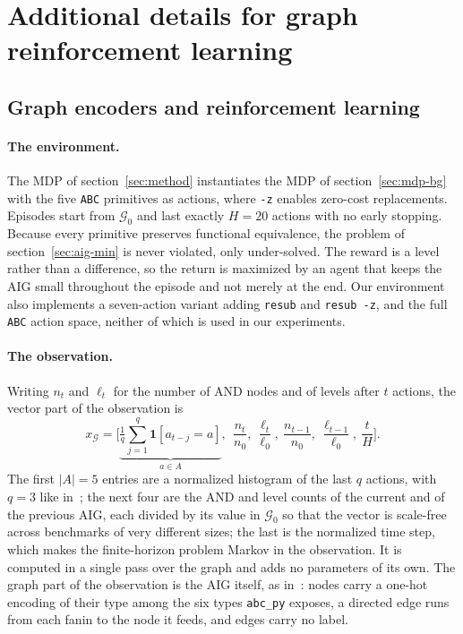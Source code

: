 \documentclass{article}
\begin{document}

\appendix

\clearpage
\section{Additional details for graph reinforcement learning}\label{app:hp}

\subsection{Graph encoders and reinforcement learning}\label{app:rl-hp}

\paragraph{The environment.}
The MDP of section~\ref{sec:method} instantiates the MDP of section~\ref{sec:mdp-bg} with the five \texttt{ABC} primitives as actions, where \texttt{-z} enables zero-cost replacements.
Episodes start from $\mathcal{G}_0$ and last exactly $H = 20$ actions with no early stopping.
Because every primitive preserves functional equivalence, the problem of section~\ref{sec:aig-min} is never violated, only under-solved.
The reward is a level rather than a difference, so the return is maximized by an agent that keeps the AIG small throughout the episode and not merely at the end.
Our environment also implements a seven-action variant adding \texttt{resub} and \texttt{resub -z}, and the full \texttt{ABC} action space, neither of which is used in our experiments.

\paragraph{The observation.}
Writing $n_t$ and $\ell_t$ for the number of AND nodes and of levels after $t$ actions, the vector part of the observation is
{\small$$x_\mathcal{G} = \Big[\underbrace{\tfrac{1}{q}\textstyle\sum_{j=1}^{q}\mathbf{1}[a_{t-j} = a]}_{a \in A},\ \ \frac{n_t}{n_0},\ \frac{\ell_t}{\ell_0},\ \frac{n_{t-1}}{n_0},\ \frac{\ell_{t-1}}{\ell_0},\ \frac{t}{H}\Big].$$}
The first $|A| = 5$ entries are a normalized histogram of the last $q$ actions, with $q = 3$ like in~\citet{rl-gnn1}; the next four are the AND and level counts of the current and of the previous AIG, each divided by its value in $\mathcal{G}_0$ so that the vector is scale-free across benchmarks of very different sizes; the last is the normalized time step, which makes the finite-horizon problem Markov in the observation.
It is computed in a single pass over the graph and adds no parameters of its own.
The graph part of the observation is the AIG itself, as in~\citet{rl-gnn1}: nodes carry a one-hot encoding of their type among the six types \texttt{abc\_py} exposes, a directed edge runs from each fanin to the node it feeds, and edges carry no label.
\end{document}
